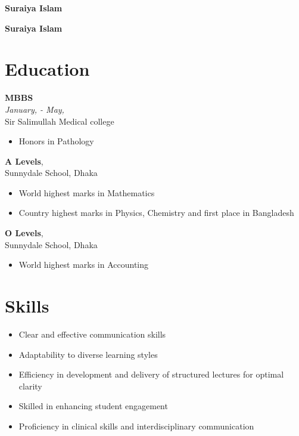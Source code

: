 \documentclass[a4paper,11pt]{article}
\newcommand{\resumeentry}[2]{
    \textbf{#1} \\
    \textit{#2}
}
\begin{document}
\begin{minipage}[t][2cm]{0.4\textwidth}
    {\huge\bfseries\color{black}Suraiya Islam}
\end{minipage}

\begin{minipage}[t][2cm]{0.4\textwidth}
    {\huge\bfseries\color{black}Suraiya Islam}
\end{minipage}

\begin{minipage}[t][12cm]{0.33\textwidth}
\raggedright

\section*{Education}
  \resumeentry{MBBS}{January, {} - May, {\numfont 2022}}\\ Sir Salimullah Medical college
  \begin{itemize}[left=0em, topsep=2pt, itemsep=0pt, parsep=0pt]
    \item Honors in Pathology
  \end{itemize} \vspace{2mm}
  \textbf{A Levels}, \textit{{}}\\ Sunnydale School, Dhaka
  \begin{itemize}[left=0em, topsep=2pt, itemsep=0pt, parsep=0pt]
    \item World highest marks in Mathematics
    \item Country highest marks in Physics, Chemistry and first place in Bangladesh
  \end{itemize} \vspace{2mm}
  \textbf{O Levels}, \textit{{}}\\ Sunnydale School, Dhaka \\
  \begin{itemize}[left=0em, topsep=0pt, itemsep=0pt, parsep=0pt]
    \item World highest marks in Accounting
  \end{itemize}
\section*{Skills}
\begin{itemize}[left=0em, itemsep=0pt, parsep=0pt]
  \item Clear and effective communication skills
  \item Adaptability to diverse learning styles  
  \item Efficiency in development and delivery of structured lectures for optimal clarity 
  \item Skilled in enhancing student engagement
  \item Proficiency in clinical skills and interdisciplinary communication
\end{itemize}

\end{minipage}
\end{document}

